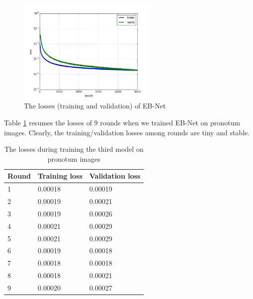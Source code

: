 \documentclass[review]{elsarticle}
\begin{document}
\begin{figure}[h!]
    \centering
    \includegraphics[width=0.6\textwidth]{images/model3_loss}
    \caption{The losses (training and validation) of EB-Net}
    \label{figloss3}
\end{figure}

Table \ref{tbltrainingloss} resumes the losses of $9$ rounds when we
trained EB-Net on pronotum images. Clearly, the training/validation
losses among rounds are tiny and stable.

\begin{table}[h!]
	\centering
	\begin{tabular}{l l l}
	Round & Training loss & Validation loss \\ \hline
	1 & 0.00018 & 0.00019  \\ \hline
	2 & 0.00019 & 0.00021 \\ \hline
	3 & 0.00019 & 0.00026 \\ \hline
	4 & 0.00021 & 0.00029 \\ \hline
	5 & 0.00021 & 0.00029 \\ \hline
	6 & 0.00019 & 0.00018 \\ \hline
	7 & 0.00018 & 0.00018 \\ \hline
	8 & 0.00018 & 0.00021 \\ \hline
	9 & 0.00020 & 0.00027 \\ \hline
	\end{tabular}
	\caption{\small{The losses during training the third model on pronotum images}}
	\label{tbltrainingloss}
\end{table}
\end{document}
